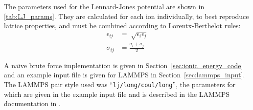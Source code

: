 The parameters used for the Lennard-Jones potential are shown in \autoref{tab:LJ_params}. They are calculated for each ion individually, to best reproduce lattice properties, and must be combined according to Lorentx-Berthelot rules:
\begin{align}
\epsilon_{ij} &= \sqrt[]{\epsilon_i \epsilon_j} \nonumber\\
\sigma_{ij} &= \frac{\sigma_i + \sigma_j}{2}
\end{align}

A na\"{\i}ve brute force implementation is given in Section~\ref{sec:ionic_energy_code} and an example input file is given for LAMMPS in Section~\ref{sec:lammps_input}. The LAMMPS pair style used was ``\texttt{lj/long/coul/long}'', the parameters for which are given in the example input file and is described in the LAMMPS documentation in \cite{LAMMPS_web}.




























































